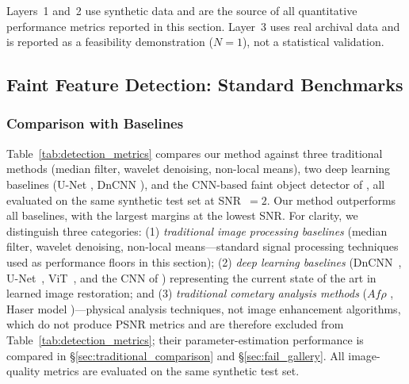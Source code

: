 \documentclass[usenatbib]{mnras}
\begin{document}
Layers~1 and~2 use synthetic data and are the source of all quantitative performance metrics reported in this section. Layer~3 uses real archival data and is reported as a feasibility demonstration ($N=1$), not a statistical validation.

\subsection{Faint Feature Detection: Standard Benchmarks}

\subsubsection{Comparison with Baselines}

Table~\ref{tab:detection_metrics} compares our method against three traditional methods (median filter, wavelet denoising, non-local means), two deep learning baselines (U-Net \citealt{ronneberger15}, DnCNN \citealt{zhang17}), and the CNN-based faint object detector of \citet{jiang23}, all evaluated on the same synthetic test set at SNR~$=2$. Our method outperforms all baselines, with the largest margins at the lowest SNR. For clarity, we distinguish three categories: (1) \textit{traditional image processing baselines} (median filter, wavelet denoising, non-local means---standard signal processing techniques used as performance floors in this section); (2) \textit{deep learning baselines} (DnCNN~\citealt{zhang17}, U-Net~\citealt{ronneberger15}, ViT~\citealt{dosovitskiy21}, and the CNN of \citet{jiang23}) representing the current state of the art in learned image restoration; and (3) \textit{traditional cometary analysis methods} ($Af\rho$ \citep{ahearn95}, Haser model \citep{haser57})---physical analysis techniques, not image enhancement algorithms, which do not produce PSNR metrics and are therefore excluded from Table~\ref{tab:detection_metrics}; their parameter-estimation performance is compared in \S\ref{sec:traditional_comparison} and \S\ref{sec:fail_gallery}. All image-quality metrics are evaluated on the same synthetic test set.
\end{document}
